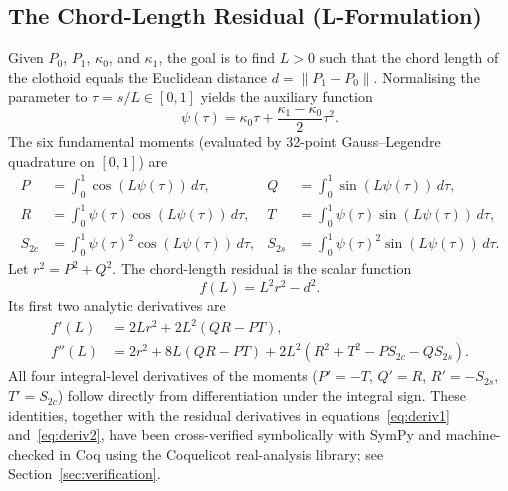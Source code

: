 \documentclass[11pt,a4paper]{article}
\begin{document}
\subsection{The Chord-Length Residual (L-Formulation)}
\label{sec:residual}
Given $P_0$, $P_1$, $\kappa_0$, and $\kappa_1$, the goal is to find $L > 0$ such that the chord length of the clothoid equals the Euclidean distance $d = \|P_1 - P_0\|$. Normalising the parameter to $\tau = s/L \in [0,1]$ yields the auxiliary function
\[
\psi(\tau) = \kappa_0 \tau + \frac{\kappa_1 - \kappa_0}{2} \tau^2.
\]
The six fundamental moments (evaluated by 32-point Gauss--Legendre quadrature on $[0,1]$) are
\begin{align}
P &= \int_0^1 \cos(L\psi(\tau))\,d\tau, &
Q &= \int_0^1 \sin(L\psi(\tau))\,d\tau, \\
R &= \int_0^1 \psi(\tau)\cos(L\psi(\tau))\,d\tau, &
T &= \int_0^1 \psi(\tau)\sin(L\psi(\tau))\,d\tau, \\
S_{2c} &= \int_0^1 \psi(\tau)^2 \cos(L\psi(\tau))\,d\tau, &
S_{2s} &= \int_0^1 \psi(\tau)^2 \sin(L\psi(\tau))\,d\tau.
\end{align}
Let $r^2 = P^2 + Q^2$. The chord-length residual is the scalar function
\begin{equation}
f(L) = L^2 r^2 - d^2. \label{eq:residual}
\end{equation}
Its first two analytic derivatives are
\begin{align}
f'(L) &= 2L r^2 + 2L^2 (QR - PT), \label{eq:deriv1} \\
f''(L) &= 2r^2 + 8L(QR - PT) + 2L^2(R^2 + T^2 - P S_{2c} - Q S_{2s}). \label{eq:deriv2}
\end{align}
All four integral-level derivatives of the moments ($P' = -T$, $Q' = R$, $R' = -S_{2s}$, $T' = S_{2c}$) follow directly from differentiation under the integral sign. These identities, together with the residual derivatives in equations~\eqref{eq:deriv1} and~\eqref{eq:deriv2}, have been cross-verified symbolically with SymPy and machine-checked in Coq using the Coquelicot real-analysis library; see Section~\ref{sec:verification}.
\end{document}
